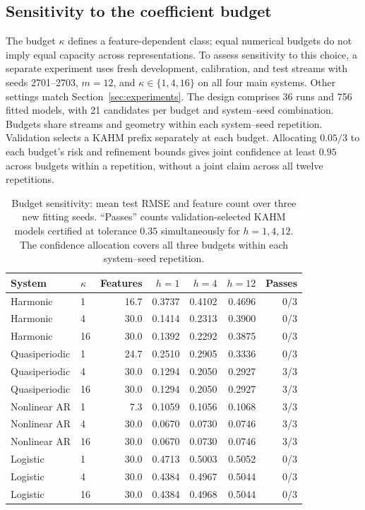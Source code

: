 \subsection{Sensitivity to the coefficient budget}
\label{sec:budget-sensitivity}

The budget $\kappa$ defines a feature-dependent class; equal numerical budgets
do not imply equal capacity across representations. To assess sensitivity to
this choice, a separate experiment uses fresh development, calibration, and
test streams with seeds 2701--2703, $m=12$, and $\kappa\in\{1,4,16\}$ on all
four main systems. Other settings match Section~\ref{sec:experiments}. The
design comprises 36 runs and 756 fitted models, with 21 candidates per
budget and system--seed combination. Budgets share streams and geometry
within each system--seed repetition. Validation selects a KAHM prefix
separately at each budget. Allocating $0.05/3$ to each budget's risk and
refinement bounds gives joint confidence at least $0.95$ across budgets
within a repetition, without a joint claim across all twelve repetitions.

\begin{table}[t]
  \centering
  \small
  \setlength{\tabcolsep}{4pt}
\begin{tabular}{llrrrrr}
\toprule
System & $\kappa$ & Features & $h=1$ & $h=4$ & $h=12$ & Passes \\
\midrule
Harmonic & 1 & 16.7 & 0.3737 & 0.4102 & 0.4696 & 0/3 \\
Harmonic & 4 & 30.0 & 0.1414 & 0.2313 & 0.3900 & 0/3 \\
Harmonic & 16 & 30.0 & 0.1392 & 0.2292 & 0.3875 & 0/3 \\
\addlinespace[2pt]
Quasiperiodic & 1 & 24.7 & 0.2510 & 0.2905 & 0.3336 & 0/3 \\
Quasiperiodic & 4 & 30.0 & 0.1294 & 0.2050 & 0.2927 & 3/3 \\
Quasiperiodic & 16 & 30.0 & 0.1294 & 0.2050 & 0.2927 & 3/3 \\
\addlinespace[2pt]
Nonlinear AR & 1 & 7.3 & 0.1059 & 0.1056 & 0.1068 & 3/3 \\
Nonlinear AR & 4 & 30.0 & 0.0670 & 0.0730 & 0.0746 & 3/3 \\
Nonlinear AR & 16 & 30.0 & 0.0670 & 0.0730 & 0.0746 & 3/3 \\
\addlinespace[2pt]
Logistic & 1 & 30.0 & 0.4713 & 0.5003 & 0.5052 & 0/3 \\
Logistic & 4 & 30.0 & 0.4384 & 0.4967 & 0.5044 & 0/3 \\
Logistic & 16 & 30.0 & 0.4384 & 0.4968 & 0.5044 & 0/3 \\
\bottomrule
\end{tabular}

  \caption{Budget sensitivity: mean test RMSE and feature count over three
  new fitting seeds. ``Passes'' counts validation-selected KAHM models
  certified at tolerance $0.35$ simultaneously for $h=1,4,12$. The confidence
  allocation covers all three budgets within each system--seed repetition.}
  \label{tab:budget}
\end{table}

